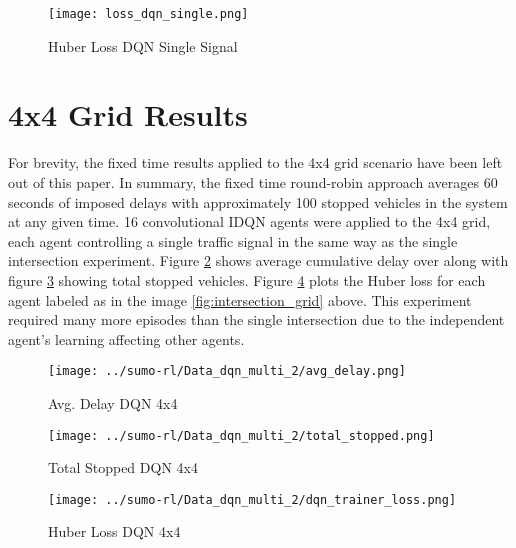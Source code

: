 \documentclass[letterpaper]{article} %
\begin{document}
\begin{figure}[htbp]
  \centering
  \texttt{[image: loss\_dqn\_single.png]}
  \caption{Huber Loss DQN Single Signal}
  \label{fig:loss_dqn_single}
\end{figure}

\section{4x4 Grid Results}
For brevity, the fixed time results applied to the 4x4 grid scenario have been left out of this paper.
In summary, the fixed time round-robin approach averages 60 seconds of imposed delays with approximately 100 stopped vehicles in the system at any given time.
16 convolutional IDQN agents were applied to the 4x4 grid, each agent controlling a single traffic signal in the same way as the single intersection experiment.
Figure \ref{fig:delays_dqn_multi} shows average cumulative delay over along with figure \ref{fig:total_stopped_dqn_multi} showing total stopped vehicles.
Figure \ref{fig:loss_dqn_multi} plots the Huber loss for each agent labeled as in the image \ref{fig:intersection_grid} above.
This experiment required many more episodes than the single intersection due to the independent agent's learning affecting other agents.

\begin{figure}[htbp]
  \centering
  \texttt{[image: ../sumo-rl/Data\_dqn\_multi\_2/avg\_delay.png]}
  \caption{Avg. Delay DQN 4x4}
  \label{fig:delays_dqn_multi}
\end{figure}

\begin{figure}[htbp]
  \centering
  \texttt{[image: ../sumo-rl/Data\_dqn\_multi\_2/total\_stopped.png]}
  \caption{Total Stopped DQN 4x4}
  \label{fig:total_stopped_dqn_multi}
\end{figure}

\begin{figure}[htbp]
  \centering
  \texttt{[image: ../sumo-rl/Data\_dqn\_multi\_2/dqn\_trainer\_loss.png]}
  \caption{Huber Loss DQN 4x4}
  \label{fig:loss_dqn_multi}
\end{figure}
\end{document}
